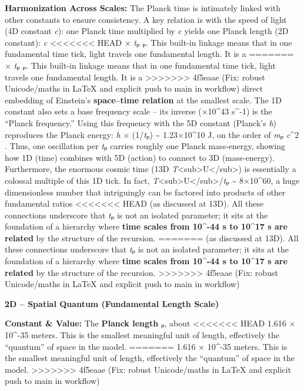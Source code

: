 \documentclass[]{article}
\begin{document}
\textbf{Harmonization Across Scales:} The Planck time is intimately
linked with other constants to ensure consistency. A key relation is
with the speed of light (4D constant \emph{c}): one Planck time
multiplied by \emph{c} yields one Planck length (2D constant): \emph{c}
<<<<<<< HEAD
× \emph{t}ₚ \approx \emph{\ell}ₚ\hspace{0pt}. This built-in linkage means that in
one fundamental time tick, light travels one fundamental length. It is a
=======
× \emph{t}ₚ \approx \emph{\ell}ₚ​. This built-in linkage means that in one
fundamental time tick, light travels one fundamental length. It is a
>>>>>>> 4f5eaae (Fix: robust Unicode/maths in LaTeX and explicit push to main in workflow)
direct embedding of Einstein's \textbf{space--time relation} at the
smallest scale. The 1D constant also sets a base frequency scale -- its
inverse (×10\^{}43 s\^{}-1) is the ``Planck frequency.'' Using
this frequency with the 5D constant (Planck's \emph{h}) reproduces the
Planck energy: \emph{h} × (1/\emph{t}ₚ) \textasciitilde{} 1.23×10\^{}10
J, on the order of \emph{m}ₚ \emph{c}\^{}2​. Thus, one oscillation per
\emph{t}ₚ carries roughly one Planck mass-energy, showing how 1D (time)
combines with 5D (action) to connect to 3D (mass-energy). Furthermore,
the enormous cosmic time (13D
\emph{T}\textless{}sub\textgreater{}U\textless{}/sub\textgreater{}) is
essentially a colossal multiple of this 1D tick. In fact,
\emph{T}\textless{}sub\textgreater{}U\textless{}/sub\textgreater{}/\emph{t}ₚ
\textasciitilde{} 8×10\^{}60, a huge dimensionless number that
intriguingly can be factored into products of other fundamental ratios
<<<<<<< HEAD
(as discussed at 13D)\hspace{0pt}. All these connections underscore that
\emph{t}ₚ is not an isolated parameter; it sits at the foundation of a
hierarchy where \textbf{time scales from 10\^{}-44 s to 10\^{}17 s are
related} by the structure of the recursion.
=======
(as discussed at 13D)​. All these connections underscore that \emph{t}ₚ
is not an isolated parameter; it sits at the foundation of a hierarchy
where \textbf{time scales from 10\^{}-44 s to 10\^{}17 s are related} by
the structure of the recursion.
>>>>>>> 4f5eaae (Fix: robust Unicode/maths in LaTeX and explicit push to main in workflow)

\textbf{2D -- Spatial Quantum (Fundamental Length Scale)}

\textbf{Constant \& Value:} The \textbf{Planck length} \emph{\ell}ₚ, about
<<<<<<< HEAD
1.616 × 10\^{}-35 meters\hspace{0pt}. This is the smallest meaningful
unit of length, effectively the ``quantum'' of space in the model.
=======
1.616 × 10\^{}-35 meters​. This is the smallest meaningful unit of
length, effectively the ``quantum'' of space in the model.
>>>>>>> 4f5eaae (Fix: robust Unicode/maths in LaTeX and explicit push to main in workflow)
\end{document}
